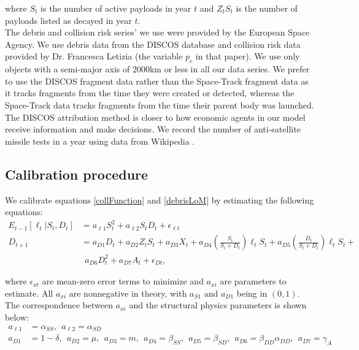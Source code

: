 \documentclass[12pt]{article}
\begin{document}
where $S_t$ is the number of active payloads in year $t$ and $Z_tS_t$ is the number of payloads listed as decayed in year $t$. \\

The debris and collision risk series' we use were provided by the European Space Agency. We use debris data from the DISCOS database \citep{FRAGdata} and collision risk data provided by Dr. Francesca Letizia \citep{ECOBdata} (the variable $p_c$ in that paper). We use only objects with a semi-major axis of 2000km or less in all our data series. We prefer to use the DISCOS fragment data rather than the Space-Track fragment data as it tracks fragments from the time they were created or detected, whereas the Space-Track data tracks fragments from the time their parent body was launched. The DISCOS attribution method is closer to how economic agents in our model receive information and make decisions. We record the number of anti-satellite missile tests in a year using data from Wikipedia \citep{ASATdata}.


\subsection{Calibration procedure}
We calibrate equations \ref{collFunction} and \ref{debrisLoM} by estimating the following equations:
\begin{align}
\label{riskEstimation}
E_{t-1}[\ell_t|S_t,D_t] &= a_{\ell 1} S_t^2 + a_{\ell 2} S_t D_t + \epsilon_{\ell t}  \\
\label{debLoMEstimation}
D_{t+1} &= a_{D 1} D_t + a_{D 2}Z_tS_t + a_{D 3} X_t  + a_{D4} \left( \frac{S_t}{S_t+D_t} \right ) \ell_t S_t + a_{D5}\left( \frac{D_t}{S_t+D_t} \right ) \ell_t S_t + \\
&~~  a_{D6} D_t^2 + a_{D7}A_t + \epsilon_{D t},
\end{align}

where $\epsilon_{xt}$ are mean-zero error terms to minimize and $a_{xi}$ are parameters to estimate. All $a_{xi}$ are nonnegative in theory, with $a_{S1}$ and $a_{D1}$ being in $(0,1)$. The correspondence between $a_{xi}$ and the structural physics parameters is shown below:
\begin{align*}
a_{\ell 1} &= \alpha_{SS}, ~~ a_{\ell 2} = \alpha_{SD} \\
a_{D1} &= 1-\delta, ~~ a_{D 2} = \mu, ~~ a_{D 3} = m, ~~ a_{D4} = \beta_{SS}, ~~ a_{D5} = \beta_{SD}, ~~ a_{D6} = \beta_{DD}\alpha_{DD}, ~~ a_{D7} = \gamma_A
\end{align*}
\end{document}
